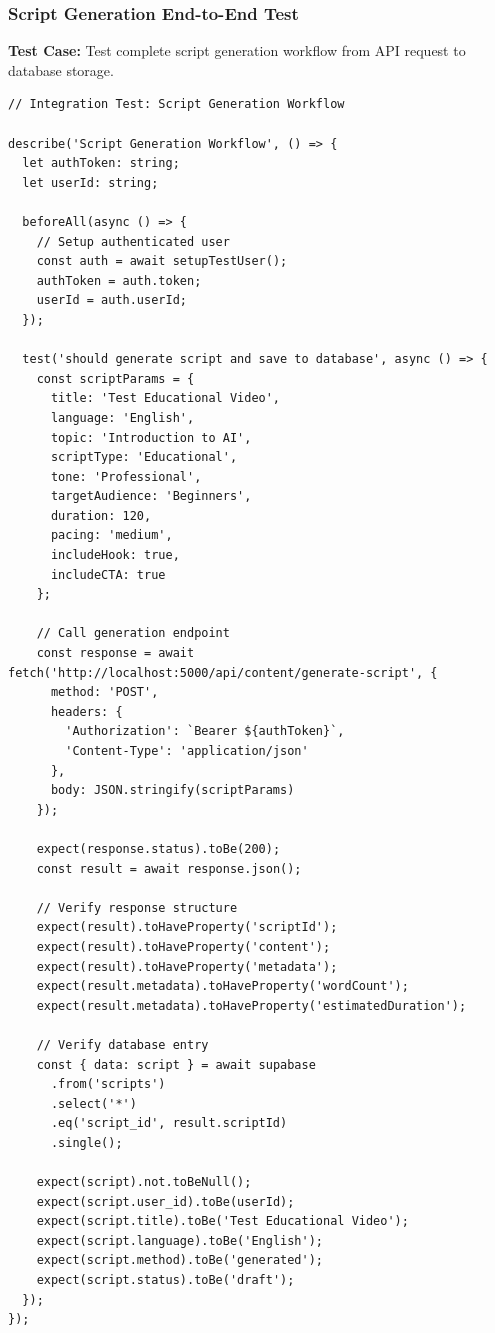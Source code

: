 \subsubsection{Script Generation End-to-End Test}

\textbf{Test Case:} Test complete script generation workflow from API request to database storage.

\begin{verbatim}
// Integration Test: Script Generation Workflow

describe('Script Generation Workflow', () => {
  let authToken: string;
  let userId: string;

  beforeAll(async () => {
    // Setup authenticated user
    const auth = await setupTestUser();
    authToken = auth.token;
    userId = auth.userId;
  });

  test('should generate script and save to database', async () => {
    const scriptParams = {
      title: 'Test Educational Video',
      language: 'English',
      topic: 'Introduction to AI',
      scriptType: 'Educational',
      tone: 'Professional',
      targetAudience: 'Beginners',
      duration: 120,
      pacing: 'medium',
      includeHook: true,
      includeCTA: true
    };
    
    // Call generation endpoint
    const response = await fetch('http://localhost:5000/api/content/generate-script', {
      method: 'POST',
      headers: {
        'Authorization': `Bearer ${authToken}`,
        'Content-Type': 'application/json'
      },
      body: JSON.stringify(scriptParams)
    });
    
    expect(response.status).toBe(200);
    const result = await response.json();
    
    // Verify response structure
    expect(result).toHaveProperty('scriptId');
    expect(result).toHaveProperty('content');
    expect(result).toHaveProperty('metadata');
    expect(result.metadata).toHaveProperty('wordCount');
    expect(result.metadata).toHaveProperty('estimatedDuration');
    
    // Verify database entry
    const { data: script } = await supabase
      .from('scripts')
      .select('*')
      .eq('script_id', result.scriptId)
      .single();
    
    expect(script).not.toBeNull();
    expect(script.user_id).toBe(userId);
    expect(script.title).toBe('Test Educational Video');
    expect(script.language).toBe('English');
    expect(script.method).toBe('generated');
    expect(script.status).toBe('draft');
  });
});
\end{verbatim}

